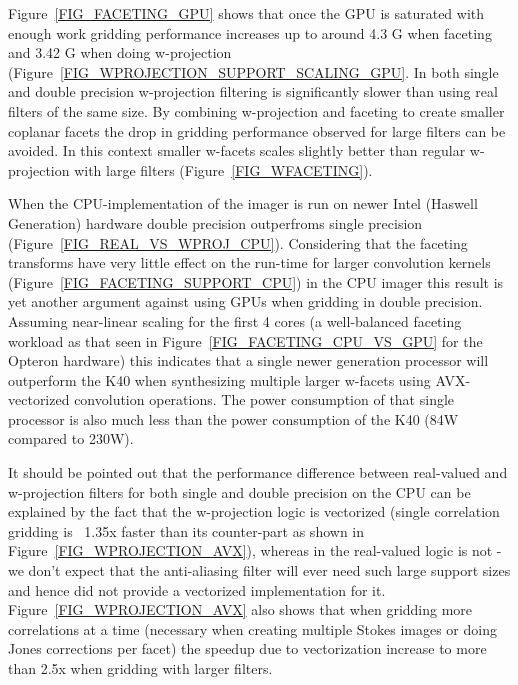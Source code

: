 Figure~\ref{FIG_FACETING_GPU} shows that once the GPU is saturated with enough work gridding performance increases up to around 4.3 G when faceting and 3.42 G when doing 
w-projection (Figure~\ref{FIG_WPROJECTION_SUPPORT_SCALING_GPU}. In both single and double precision w-projection filtering is significantly slower than using real filters 
of the same size. By combining w-projection and faceting to create smaller coplanar facets the drop in gridding performance observed for large filters can be avoided. In this
context smaller w-facets scales slightly better than regular w-projection with large filters (Figure~\ref{FIG_WFACETING}).

When the CPU-implementation of the imager is run on newer Intel (Haswell Generation) hardware double precision outperfroms single precision (Figure~\ref{FIG_REAL_VS_WPROJ_CPU}). Considering that
the faceting transforms have very little effect on the run-time for larger convolution kernels (Figure~\ref{FIG_FACETING_SUPPORT_CPU}) in the CPU imager this result is yet another argument against using GPUs when gridding
in double precision. Assuming near-linear scaling for the first 4 cores (a well-balanced faceting workload as that seen in Figure~\ref{FIG_FACETING_CPU_VS_GPU} for the Opteron hardware) this indicates that
a single newer generation processor will outperform the K40 when synthesizing multiple larger w-facets using AVX-vectorized convolution operations. The power consumption of that single processor is also much less than the power
consumption of the K40 (84W compared to 230W).

It should be pointed out that the performance difference between real-valued and w-projection filters for both single and double precision on the CPU can be explained by the fact that the w-projection logic is vectorized (single correlation
gridding is ~1.35x faster than its counter-part as shown in Figure~\ref{FIG_WPROJECTION_AVX}), whereas in the real-valued logic is not - we don't expect that the anti-aliasing filter will ever need such large support sizes and hence did not
provide a vectorized implementation for it. Figure~\ref{FIG_WPROJECTION_AVX} also shows that when gridding more correlations at a time (necessary when creating multiple Stokes images or doing Jones corrections per facet) the speedup 
due to vectorization increase to more than 2.5x when gridding with larger filters.

